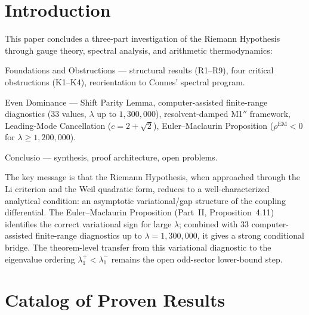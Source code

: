 \documentclass[12pt,a4paper]{article}
\theoremstyle{definition}
\theoremstyle{remark}
\begin{document}
\clearpage
\tableofcontents

\clearpage

\section{Introduction}
\label{sec:intro}

This paper concludes a three-part investigation of the Riemann Hypothesis through gauge theory, spectral analysis, and arithmetic thermodynamics:
\begin{description}[font=\bfseries,leftmargin=2em]
  \item[Part~I \cite{Geiger2026partI}:] Foundations and Obstructions --- structural results (R1--R9), four critical obstructions (K1--K4), reorientation to Connes' spectral program.
  \item[Part~II \cite{Geiger2026partII}:] Even Dominance --- Shift Parity Lemma, computer-assisted finite-range diagnostics ($33$ values, $\lambda$ up to $1{,}300{,}000$), resolvent-damped M1$''$ framework, Leading-Mode Cancellation ($c = 2 + \sqrt{2}$), Euler--Maclaurin Proposition ($\rho^{\mathrm{EM}} < 0$ for $\lambda \geq 1{,}200{,}000$).
  \item[Part~III (this paper):] Conclusio --- synthesis, proof architecture, open problems.
\end{description}

The key message is that the Riemann Hypothesis, when approached through the Li criterion and the Weil quadratic form, reduces to a well-characterized analytical condition: an asymptotic variational/gap structure of the coupling differential. The Euler--Maclaurin Proposition (Part~II, Proposition~4.11) identifies the correct variational sign for large $\lambda$; combined with $33$ computer-assisted finite-range diagnostics up to $\lambda = 1{,}300{,}000$, it gives a strong conditional bridge. The theorem-level transfer from this variational diagnostic to the eigenvalue ordering $\lambda_1^+<\lambda_1^-$ remains the open odd-sector lower-bound step.


\section{Catalog of Proven Results}
\label{sec:catalog}
\end{document}
